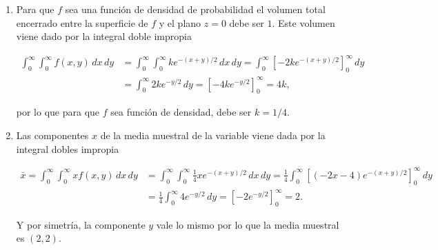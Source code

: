 \documentclass[
  spanish,
  a4paper,
]{scrreport}
\theoremstyle{definition}
\theoremstyle{remark}
\begin{document}
\begin{tcolorbox}[enhanced jigsaw, arc=.35mm, bottomrule=.15mm, bottomtitle=1mm, breakable, colback=white, colbacktitle=quarto-callout-tip-color!10!white, colframe=quarto-callout-tip-color-frame, coltitle=black, left=2mm, leftrule=.75mm, opacityback=0, opacitybacktitle=0.6, rightrule=.15mm, title=\textcolor{quarto-callout-tip-color}{\faLightbulb}\hspace{0.5em}{Solución}, titlerule=0mm, toprule=.15mm, toptitle=1mm]

\begin{enumerate}
\def\labelenumi{\alph{enumi}.}
\item
  Para que \(f\) sea una función de densidad de probabilidad el volumen
  total encerrado entre la superficie de \(f\) y el plano \(z=0\) debe
  ser \(1\). Este volumen viene dado por la integral doble impropia

  \begin{align*}
  \int_0^\infty \int_0^\infty f(x,y)\,dx\,dy
  &= \int_0^\infty \int_0^\infty ke^{-(x+y)/2}\,dx\,dy 
  = \int_0^\infty \left[-2ke^{-(x+y)/2}\right]_0^\infty\,dy \\
  &= \int_0^\infty 2ke^{-y/2}\,dy 
  = [-4ke^{-y/2}]_0^\infty 
  = 4k,
  \end{align*}

  por lo que para que \(f\) sea función de densidad, debe ser \(k=1/4\).
\item
  Las componentes \(x\) de la media muestral de la variable viene dada
  por la integral dobles impropia

  \begin{align*}
  \bar x 
  = \int_0^\infty \int_0^\infty xf(x,y)\,dx\,dy
  &= \int_0^\infty \int_0^\infty \frac{1}{4}xe^{-(x+y)/2}\,dx\,dy 
  = \frac{1}{4}\int_0^\infty \left[(-2x-4)e^{-(x+y)/2}\right]_0^\infty\,dy \\
  &= \frac{1}{4}\int_0^\infty 4e^{-y/2}\,dy 
  = [-2e^{-y/2}]_0^\infty 
  = 2.
  \end{align*}

  Y por simetría, la componente \(y\) vale lo mismo por lo que la media
  muestral es \((2,2)\).
\end{enumerate}

\end{tcolorbox}
\end{document}
